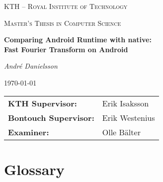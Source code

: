 \documentclass[a4paper, 12pt, notitlepage]{report}
\def\thesistitle{\LARGE Comparing Android Runtime with native:\\ Fast Fourier Transform on Android}
\def\theauthor{André Danielsson}
\def\theschool{KTH -- Royal Institute of Technology}
\def\thedegree{Master's Thesis in Computer Science}
\def\thesupervisors{%
    \begin{tabular}{ll}
        \textbf{KTH Supervisor:} & Erik Isaksson\\
        \textbf{Bontouch Supervisor:} & Erik Westenius\\
        \textbf{Examiner:} & Olle Bälter
    \end{tabular}
}
\begin{document}

\begin{titlepage}
    \centering
    {\scshape\large\theschool\par}
    \vspace{1cm}
    {\scshape\normalsize\thedegree\par}
    \vspace{1.5cm}
    {\Large\bfseries\thesistitle\par}
    \vspace{1.5cm}
    {\large\itshape\theauthor\par}
    \vspace{1cm}
    {\large \today\par}

    \vfill

    {\large\thesupervisors\par}
    \vspace{1cm}
\end{titlepage}

\begin{abstract}
    
\end{abstract}

\vspace{1cm}

\renewcommand{\abstractname}{Sammanfattning}
\begin{abstract}
    
\end{abstract}

\newpage
\section*{Glossary}


\tableofcontents
\end{document}
